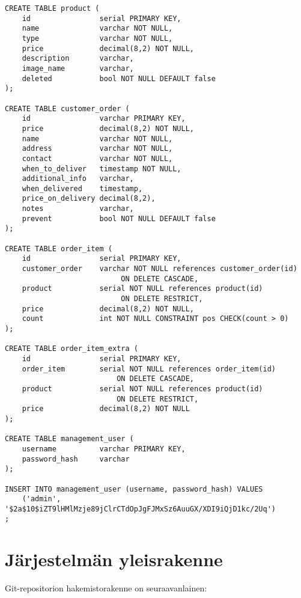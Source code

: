\documentclass[a4paper, 12pt, finnish]{article}
\begin{document}
\begin{verbatim}
CREATE TABLE product (
    id                serial PRIMARY KEY,
    name              varchar NOT NULL,
    type              varchar NOT NULL,
    price             decimal(8,2) NOT NULL,
    description       varchar,
    image_name        varchar,
    deleted           bool NOT NULL DEFAULT false
);

CREATE TABLE customer_order (
    id                varchar PRIMARY KEY,
    price             decimal(8,2) NOT NULL,
    name              varchar NOT NULL,
    address           varchar NOT NULL,
    contact           varchar NOT NULL,
    when_to_deliver   timestamp NOT NULL,
    additional_info   varchar,
    when_delivered    timestamp,
    price_on_delivery decimal(8,2),
    notes             varchar,
    prevent           bool NOT NULL DEFAULT false
);

CREATE TABLE order_item (
    id                serial PRIMARY KEY,
    customer_order    varchar NOT NULL references customer_order(id)
                           ON DELETE CASCADE,
    product           serial NOT NULL references product(id)
                           ON DELETE RESTRICT,
    price             decimal(8,2) NOT NULL,
    count             int NOT NULL CONSTRAINT pos CHECK(count > 0)
);

CREATE TABLE order_item_extra (
    id                serial PRIMARY KEY,
    order_item        serial NOT NULL references order_item(id)
                          ON DELETE CASCADE,
    product           serial NOT NULL references product(id)
                          ON DELETE RESTRICT,
    price             decimal(8,2) NOT NULL
);

CREATE TABLE management_user (
    username          varchar PRIMARY KEY,
    password_hash     varchar
);

INSERT INTO management_user (username, password_hash) VALUES
	('admin', '$2a$10$iZT9lHMlMzje89jClrCTdOpJgFJMxSz6AuuGX/XDI9iQjD1kc/2Uq')
;
\end{verbatim}

\section{Järjestelmän yleisrakenne}

Git-repositorion hakemistorakenne on seuraavanlainen:
\end{document}
